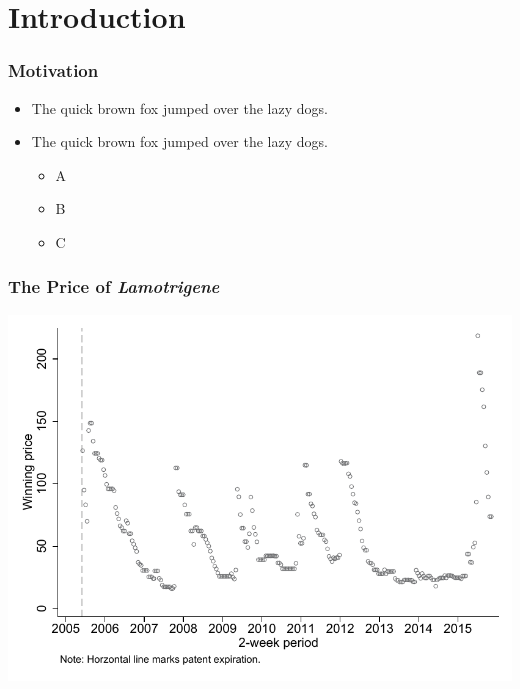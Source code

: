 \section{Introduction}

\begin{frame}
\frametitle{Motivation}
\begin{itemize}

\item<+-> The quick brown fox jumped over the lazy dogs.

\item<+-> The quick brown fox jumped over the lazy dogs.


       \begin{itemize}
             \item A
	     \item B
	     \item C
       \end{itemize}

\end{itemize}
\end{frame}

\begin{frame}\frametitle{The Price of \emph{Lamotrigene}}
\begin{center}
    \includegraphics[width=.8\textwidth]{Sample-Figure.pdf}
\end{center}
\end{frame}


